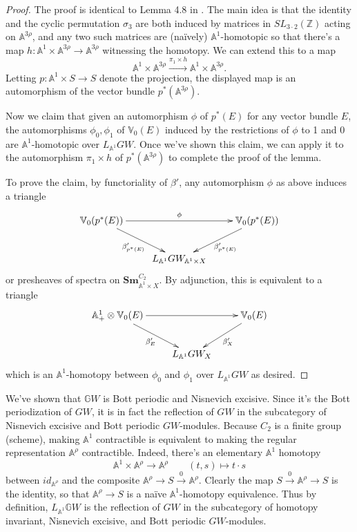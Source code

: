 \documentclass[edeposit,fullpage]{uiucthesis2009}
\newcommand{\Z}{\mathbb Z}
\newcommand{\mbb}{\mathbb}
\newcommand{\Sm}[1]{\mathbf{Sm}_{#1}}
\theoremstyle{plain}
\numberwithin{lemma}{section}
\theoremstyle{definition}
\begin{document}
\begin{proof}
The proof is identical to Lemma 4.8 in \cite{cdhdesc}. The main idea
is that the identity and the cyclic permutation $\sigma_3$ are both
induced by matrices in $SL_{3\cdot 2}(\Z)$ acting on $\mbb A^{3\rho}$,
and any two such matrices are (na\"ively) $\mbb A^1$-homotopic so
that there's a map $h: \mbb A^1 \times \mbb A^{3\rho} \rightarrow \mbb
A^{3\rho}$ witnessing the homotopy. We can extend this to a map
\[
\mbb A^1 \times \mbb A^{3\rho} \xrightarrow{\pi_1 \times h} \mbb A^1 \times \mbb A^{3\rho}.
\]
Letting $p : \mbb A^1 \times S \rightarrow S$ denote the projection, the
displayed map is an automorphism of the vector bundle $p^*(\mbb
A^{3\rho})$.

Now we claim that given an automorphism $\phi$ of $p^*(E)$ for
any vector bundle $E$, the automorphisms $\phi_0,\phi_1$ of $\mbb
V_0(E)$ induced by the restrictions of $\phi$ to 1 and 0 are $\mbb
A^1$-homotopic over $L_{\mbb A^1}GW$. Once we've shown this claim, we can
apply it to the
automorphism $\pi_1 \times h$ of $p^*(\mbb A^{3\rho})$ to complete the
proof of the lemma. 

To prove the claim, by functoriality of $\beta'$, any automorphism
$\phi$ as above induces a triangle
\[
\xymatrix{\mbb V_0(p^*(E)) \ar[rr]^\phi \ar[dr]_{\beta'_{p^*(E)}} & & \mbb V_0(p^*(E))
  \ar[dl]^{\beta'_{p^*(E)}} \\ & L_{\mbb A^1}GW_{\mbb A^1 \times X}}
\]
or presheaves of spectra on $\Sm{\mbb A^1 \times X}^{C_2}$. By
adjunction, this is equivalent to a triangle
\[
\xymatrix{\mbb A^1_+ \otimes \mbb V_0(E) \ar[rr] \ar[dr]_{\beta'_E} && \mbb V_0(E)
  \ar[dl]^{\beta'_X} \\ & L_{\mbb A^1}GW_X}
\]
which is an $\mbb A^1$-homotopy between $\phi_0$ and $\phi_1$ over
$L_{\mbb A^1}GW$ as desired.
\end{proof}

We've shown that $\mbb GW$ is Bott periodic and
Nisnevich excisive. Since it's the Bott periodization of $GW$, it is
in fact the reflection of $GW$
in the subcategory of Nisnevich excisive and Bott periodic
$GW$-modules. Because $C_2$ is a finite group (scheme), making $\mbb
A^1$ contractible is equivalent to making the regular representation
$\mbb A^\rho$ contractible. Indeed, there's an elementary $\mbb A^1$
homotopy
\[
\mbb A^1 \times \mbb A^\rho \rightarrow \mbb A^\rho
\qquad (t,s) \mapsto t\cdot s
\]
between $id_{\mbb A^\rho}$ and the composite $\mbb A^\rho \rightarrow
S \xrightarrow{0} \mbb A^\rho$. Clearly the map $S \xrightarrow{0}
\mbb A^\rho \rightarrow S$ is the identity, so that $\mbb A^\rho
\rightarrow S$ is a na\"ive $\mbb A^1$-homotopy equivalence.
 Thus by definition, $L_{\mbb A^1}\mbb
GW$ is the reflection of $GW$ in the subcategory of homotopy
invariant, Nisnevich excisive, and Bott periodic $GW$-modules. 
\end{document}
